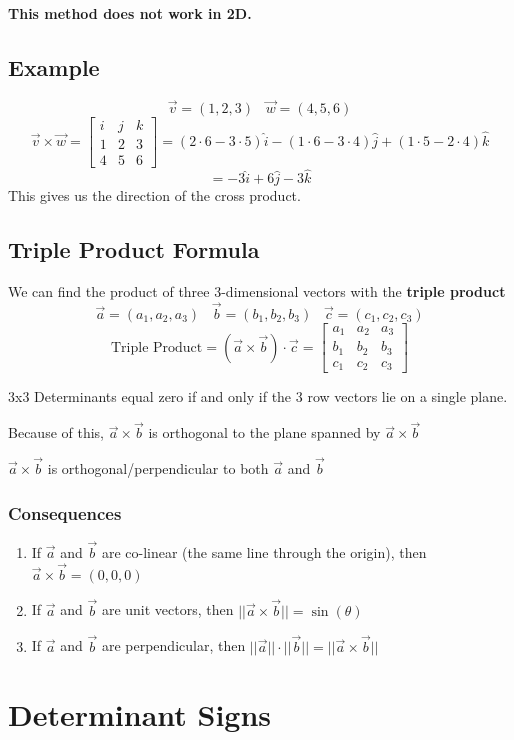 \documentclass{article}
\begin{document}
\textbf{This method does not work in 2D.}
\subsection*{Example}
\[\vec{v}=(1,2,3) \;\;\; \vec{w}=(4,5,6) \]
\[\vec{v}\times \vec{w}=\begin{bmatrix}
    i&j&k\\
    1&2&3\\
    4&5&6
\end{bmatrix}=(2\cdot 6-3\cdot 5)\hat{i}-(1\cdot 6-3\cdot 4)\hat{j}+(1\cdot 5-2\cdot 4)\hat{k}\]
\[=-3\hat{i}+6\hat{j}-3\hat{k}\]
This gives us the direction of the cross product.


\subsection{Triple Product Formula}
We can find the product of three 3-dimensional vectors with the \textbf{triple product}
\[\vec{a}=(a_1,a_2,a_3)\;\;\; \vec{b}=(b_1,b_2,b_3)\;\;\; \vec{c}=(c_1,c_2,c_3)\]
\[\mbox{Triple Product}=(\vec{a}\times\vec{b})\cdot \vec{c}=\begin{bmatrix}
    a_1&a_2&a_3\\
    b_1&b_2&b_3\\
    c_1&c_2&c_3
\end{bmatrix}\]

3x3 Determinants equal zero if and only if the 3 row vectors lie on a single plane.

Because of this, $\vec{a}\times \vec{b}$ is orthogonal to the plane spanned by $\vec{a}\times \vec{b}$

$\vec{a}\times \vec{b}$ is orthogonal/perpendicular to both $\vec{a}$ and $\vec{b}$
\subsubsection*{Consequences}
\begin{enumerate}
    \item If $\vec{a}$ and $\vec{b}$ are co-linear (the same line through the origin), then $\vec{a}\times \vec{b}=(0,0,0)$
    \item If $\vec{a}$ and $\vec{b}$ are unit vectors, then $||\vec{a}\times \vec{b}||=\sin(\theta)$
    \item If $\vec{a}$ and $\vec{b}$ are perpendicular, then $||\vec{a}||\cdot ||\vec{b}||=||\vec{a}\times\vec{b}||$
\end{enumerate}
\section{Determinant Signs}
\end{document}
